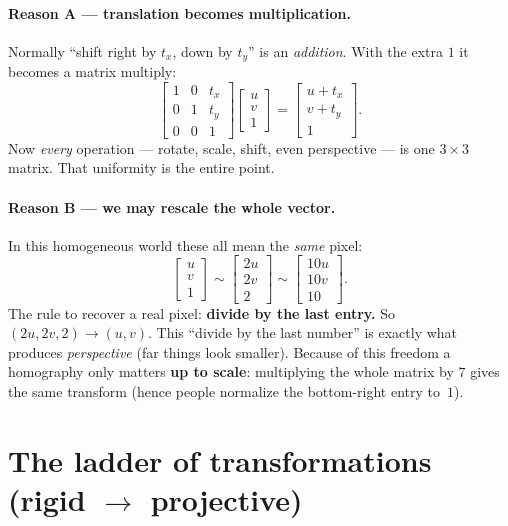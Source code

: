 \documentclass[11pt]{article}
\begin{document}
\paragraph{Reason A --- translation becomes multiplication.}
Normally ``shift right by $t_x$, down by $t_y$'' is an \emph{addition}. With the
extra $1$ it becomes a matrix multiply:
\[
\begin{bmatrix} 1&0&t_x\\ 0&1&t_y\\ 0&0&1\end{bmatrix}
\begin{bmatrix} u\\ v\\ 1\end{bmatrix}
=\begin{bmatrix} u+t_x\\ v+t_y\\ 1\end{bmatrix}.
\]
Now \emph{every} operation --- rotate, scale, shift, even perspective --- is one
$3\times3$ matrix. That uniformity is the entire point.

\paragraph{Reason B --- we may rescale the whole vector.}
In this homogeneous world these all mean the \emph{same} pixel:
\[
\begin{bmatrix} u\\ v\\ 1\end{bmatrix}\sim
\begin{bmatrix} 2u\\ 2v\\ 2\end{bmatrix}\sim
\begin{bmatrix} 10u\\ 10v\\ 10\end{bmatrix}.
\]
The rule to recover a real pixel: \textbf{divide by the last entry.} So
$(2u,2v,2)\to(u,v)$. This ``divide by the last number'' is exactly what produces
\emph{perspective} (far things look smaller). Because of this freedom a
homography only matters \textbf{up to scale}: multiplying the whole matrix by
$7$ gives the same transform (hence people normalize the bottom-right entry
to~$1$).

\section{The ladder of transformations (rigid $\to$ projective)}
\end{document}
